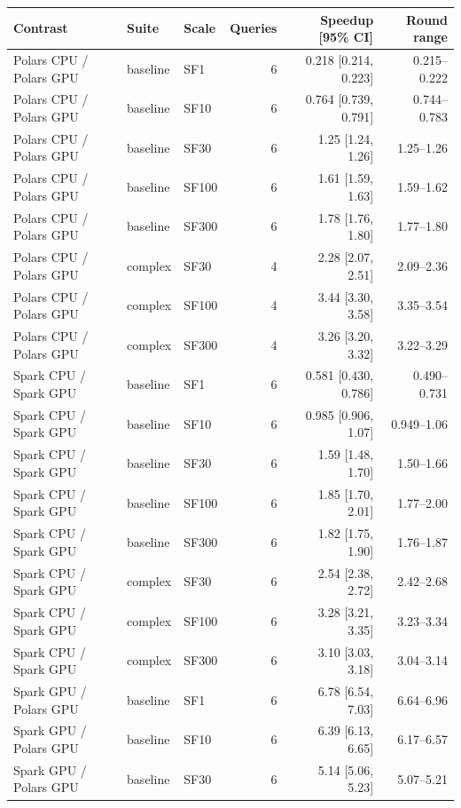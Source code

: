 \begin{tabular}{lllrrr}
\toprule
Contrast & Suite & Scale & Queries & Speedup [95\% CI] & Round range \\
\midrule
Polars CPU / Polars GPU & baseline & SF1 & 6 & 0.218 [0.214, 0.223] & 0.215--0.222 \\
Polars CPU / Polars GPU & baseline & SF10 & 6 & 0.764 [0.739, 0.791] & 0.744--0.783 \\
Polars CPU / Polars GPU & baseline & SF30 & 6 & 1.25 [1.24, 1.26] & 1.25--1.26 \\
Polars CPU / Polars GPU & baseline & SF100 & 6 & 1.61 [1.59, 1.63] & 1.59--1.62 \\
Polars CPU / Polars GPU & baseline & SF300 & 6 & 1.78 [1.76, 1.80] & 1.77--1.80 \\
Polars CPU / Polars GPU & complex & SF30 & 4 & 2.28 [2.07, 2.51] & 2.09--2.36 \\
Polars CPU / Polars GPU & complex & SF100 & 4 & 3.44 [3.30, 3.58] & 3.35--3.54 \\
Polars CPU / Polars GPU & complex & SF300 & 4 & 3.26 [3.20, 3.32] & 3.22--3.29 \\
Spark CPU / Spark GPU & baseline & SF1 & 6 & 0.581 [0.430, 0.786] & 0.490--0.731 \\
Spark CPU / Spark GPU & baseline & SF10 & 6 & 0.985 [0.906, 1.07] & 0.949--1.06 \\
Spark CPU / Spark GPU & baseline & SF30 & 6 & 1.59 [1.48, 1.70] & 1.50--1.66 \\
Spark CPU / Spark GPU & baseline & SF100 & 6 & 1.85 [1.70, 2.01] & 1.77--2.00 \\
Spark CPU / Spark GPU & baseline & SF300 & 6 & 1.82 [1.75, 1.90] & 1.76--1.87 \\
Spark CPU / Spark GPU & complex & SF30 & 6 & 2.54 [2.38, 2.72] & 2.42--2.68 \\
Spark CPU / Spark GPU & complex & SF100 & 6 & 3.28 [3.21, 3.35] & 3.23--3.34 \\
Spark CPU / Spark GPU & complex & SF300 & 6 & 3.10 [3.03, 3.18] & 3.04--3.14 \\
Spark GPU / Polars GPU & baseline & SF1 & 6 & 6.78 [6.54, 7.03] & 6.64--6.96 \\
Spark GPU / Polars GPU & baseline & SF10 & 6 & 6.39 [6.13, 6.65] & 6.17--6.57 \\
Spark GPU / Polars GPU & baseline & SF30 & 6 & 5.14 [5.06, 5.23] & 5.07--5.21 \\

\end{tabular}
